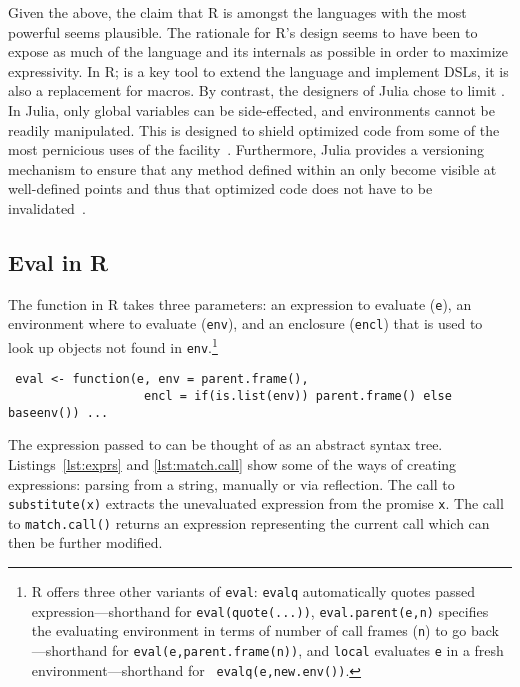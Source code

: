 \documentclass[screen,acmsmall]{acmart}%
\renewcommand{\k}[1]{\lstinline |#1|\xspace}
\begin{document}
Given the above, the claim that R is amongst the languages with the most
powerful \eval seems plausible. The rationale for R's design seems to have been
to expose as much of the language and its internals as possible in order to
maximize expressivity. In R; \eval is a key tool to extend the language and
implement DSLs, it is also a replacement for macros. By contrast, the designers
of Julia chose to limit \eval. In Julia, only global variables can be
side-effected, and environments cannot be readily manipulated. This is designed
to shield optimized code from some of the most pernicious uses of the
facility~\cite{oopsla18a}. Furthermore, Julia provides a versioning mechanism to
ensure that any method defined within an \eval only become visible at
well-defined points and thus that optimized code does not have to be
invalidated~\cite{oopsla20a}.

\subsection{Eval in R}\label{sec:eval-in-r}

The \eval function in R takes three parameters: an expression to evaluate
(\k{e}), an environment where to evaluate (\k{env}), and an enclosure (\k{encl})
that is used to look up objects not found in \k{env}.\footnote{R offers three
other variants of {\tt eval}: {\tt evalq} automatically quotes passed
expression---shorthand for {\tt eval(quote(...))}, {\tt eval.parent(e,n)}
specifies the evaluating environment in terms of number of call frames ({\tt n})
to go back---shorthand for {\tt eval(e,parent.frame(n))}, and {\tt local}
evaluates {\tt e} in a fresh environment---shorthand for {\tt
  evalq(e,new.env())}.}

\begin{lstlisting}
 eval <- function(e, env = parent.frame(),
                   encl = if(is.list(env)) parent.frame() else baseenv()) ...
\end{lstlisting}

The expression passed to \eval can be thought of as an abstract syntax tree.
Listings~\ref{lst:exprs} and \ref{lst:match.call} show some of the ways of
creating expressions: parsing from a string, manually or via reflection. The
call to \k{substitute(x)} extracts the unevaluated expression from the promise
\k{x}. The call to \k{match.call()} returns an expression representing the
current call which can then be further modified.
\end{document}
